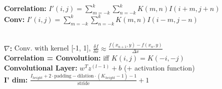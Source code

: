 \textbf{Correlation:} $I'(i,j) = \sum_{m = -k}^k \sum_{n	 = -k}^k K(m,n) I(i+m, j+n)$\\

\textbf{Conv:} $I'(i,j) = \sum_{m = -k}^k \sum_{n	 = -k}^k K(m,n) I(i-m, j-n)$\\

\\

\textbf{$\nabla$:} Conv. with kernel [-1, 1], $\frac{\delta f}{\delta x} \approx \frac{f(x_{n+1}, y) - f(x_n, y)}{\Delta x}$\\

\textbf{Correlation = Convolution:} iff $K(i,j) = K(-i, -j)$\\

\textbf{Convolutional Layer:} $w^T z^{(l-1)} + b$ (+ activation function)\\
\textbf{I' dim:} $\frac{I_{height} + 2 \cdot \text{padding} - \text{dilation} \cdot (K_{height} - 1) - 1}{\text{stride}} + 1$\\

